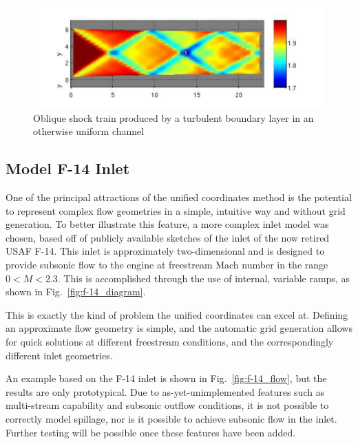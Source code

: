 \documentclass[12pt,letterpaper]{article}
\begin{document}
\begin{figure}[htbp]
  \centering
  \includegraphics[width=\textwidth]{BL_shock_train2.pdf}
  \caption[Channel Flow With a Turbulent Boundary Layer]{Oblique shock train produced by a turbulent boundary layer in an otherwise uniform channel}
  \label{fig:bl_shock_train}
\end{figure}

\subsection{Model F-14 Inlet}

One of the principal attractions of the unified coordinates method is the potential to represent complex flow geometries in a simple, intuitive way and without grid generation. To better illustrate this feature, a more complex inlet model was chosen, based off of publicly available sketches of the inlet of the now retired USAF F-14. This inlet is approximately two-dimensional and is designed to provide subsonic flow to the engine at freestream Mach number in the range $0<M<2.3$. This is accomplished through the use of internal, variable ramps, as shown in Fig.~\ref{fig:f-14_diagram}.

This is exactly the kind of problem the unified coordinates can excel at. Defining an
approximate flow geometry is simple, and the automatic grid generation
allows for quick solutions at different freestream conditions, and the
correspondingly different inlet geometries. 

An example based on the F-14 inlet is shown in
Fig.~\ref{fig:f-14_flow}, but the results are  
only prototypical. Due to as-yet-unimplemented
features such as multi-stream capability and subsonic outflow
conditions, it is not possible to correctly model spillage, nor is it
possible to achieve subsonic flow in the inlet. Further testing will
be possible once these features have been added.
\end{document}
